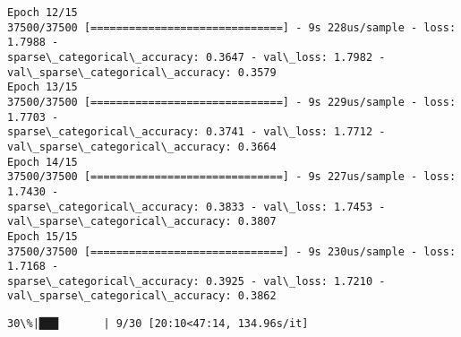 \documentclass[11pt]{article}
\begin{document}
\begin{Verbatim}[commandchars=\\\{\}]
Epoch 12/15
37500/37500 [==============================] - 9s 228us/sample - loss: 1.7988 -
sparse\_categorical\_accuracy: 0.3647 - val\_loss: 1.7982 -
val\_sparse\_categorical\_accuracy: 0.3579
Epoch 13/15
37500/37500 [==============================] - 9s 229us/sample - loss: 1.7703 -
sparse\_categorical\_accuracy: 0.3741 - val\_loss: 1.7712 -
val\_sparse\_categorical\_accuracy: 0.3664
Epoch 14/15
37500/37500 [==============================] - 9s 227us/sample - loss: 1.7430 -
sparse\_categorical\_accuracy: 0.3833 - val\_loss: 1.7453 -
val\_sparse\_categorical\_accuracy: 0.3807
Epoch 15/15
37500/37500 [==============================] - 9s 230us/sample - loss: 1.7168 -
sparse\_categorical\_accuracy: 0.3925 - val\_loss: 1.7210 -
val\_sparse\_categorical\_accuracy: 0.3862
    \end{Verbatim}

    \begin{Verbatim}[commandchars=\\\{\}]
 30\%|███       | 9/30 [20:10<47:14, 134.96s/it]
    \end{Verbatim}
\end{document}
